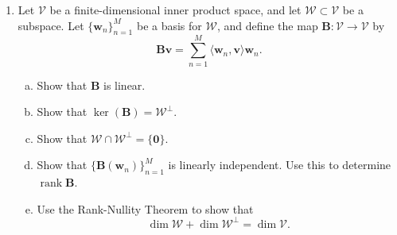 \documentclass[12pt]{amsart}
\newcommand{\1}{\mathbbm{1}}
\newcounter{Theorem}
\numberwithin{equation}{section}
\numberwithin{Theorem}{section}
\theoremstyle{plain} %
\theoremstyle{definition}
\theoremstyle{remark}
\begin{document}
\begin{enumerate}[1.]
\begin{enumerate}[(a)]
\begin{enumerate}[i.]
		\item 
		
		\item 
	\end{enumerate}
	

\end{enumerate}

\clearpage

\item Let \(\mathcal{V}\) be a finite-dimensional inner product space, and let \(\mathcal{W}\subset \mathcal{V}\) be a subspace. Let \(\{\mathbf{w}_{n}\}_{n=1}^{M}\) be a basis for \(\mathcal{W}\), and define the map \(\mathbf{B}:\mathcal{V}\to\mathcal{V}\) by
\[\mathbf{B}\mathbf{v} = \sum_{n=1}^{M}\langle \mathbf{w}_{n},\mathbf{v}\rangle \mathbf{w}_{n}.\]\medskip

\begin{enumerate}[(a)]

\item Show that \(\mathbf{B}\) is linear.\medskip

\item Show that \(\operatorname{ker}(\mathbf{B}) = \mathcal{W}^{\bot}\).\medskip

\item Show that \(\mathcal{W}\cap\mathcal{W}^{\bot}=\{\mathbf{0}\}\).\medskip

\item Show that \(\{\mathbf{B}(\mathbf{w}_{n})\}_{n=1}^{M}\) is linearly independent. Use this to determine \(\operatorname{rank}\mathbf{B}\).\medskip

\item Use the Rank-Nullity Theorem to show that
\[\dim\mathcal{W} + \dim\mathcal{W}^{\bot} = \dim\mathcal{V}.\]

\end{enumerate}\bigskip


\end{enumerate}
\end{document}
